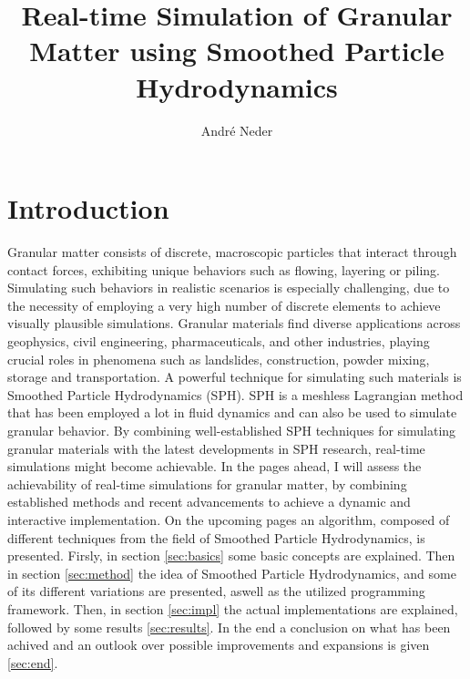 \documentclass[intern]{cgMA}
\title{Real-time Simulation of Granular Matter using Smoothed Particle Hydrodynamics}
\author{André Neder}
\begin{document}
    \maketitle
    \newpage
    \tableofcontents
    \newpage
    \section{Introduction}

    Granular matter consists of discrete, macroscopic particles that interact through contact forces, exhibiting unique behaviors such as flowing, layering or piling. Simulating such behaviors in realistic scenarios is especially challenging, due to the necessity of employing a very high number of discrete elements to achieve visually plausible simulations. Granular materials find diverse applications across geophysics, civil engineering, pharmaceuticals, and other industries, playing crucial roles in phenomena such as landslides, construction, powder mixing, storage and transportation. A powerful technique for simulating such materials is Smoothed Particle Hydrodynamics (SPH). SPH is a meshless Lagrangian method that has been employed a lot in fluid dynamics and can also be used to simulate granular behavior. By combining well-established SPH techniques for simulating granular materials with the latest developments in SPH research, real-time simulations might become achievable. In the pages ahead, I will assess the achievability of real-time simulations for granular matter, by combining established methods and recent advancements to achieve a dynamic and interactive implementation. On the upcoming pages an algorithm, composed of different techniques from the field of Smoothed Particle Hydrodynamics, is presented. Firsly, in section \ref{sec:basics} some basic concepts are explained. Then in section \ref{sec:method} the idea of Smoothed Particle Hydrodynamics, and some of its different variations are presented, aswell as the utilized programming framework. Then, in section \ref{sec:impl} the actual implementations are explained, followed by some results \ref{sec:results}. In the end a conclusion on what has been achived and an outlook over possible improvements and expansions is given \ref{sec:end}.
    \pagebreak
\end{document}
